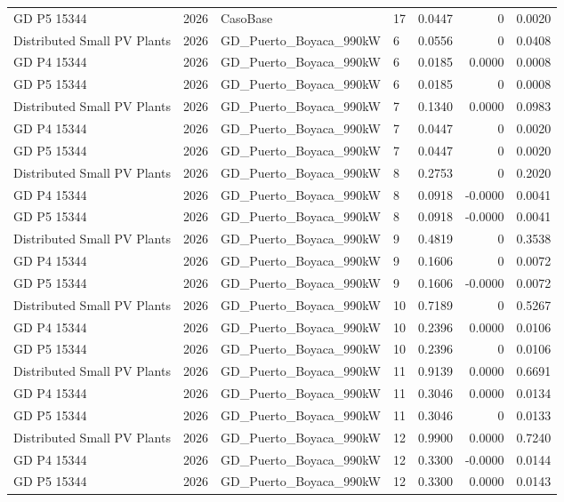 \documentclass[11pt,a4paper]{article}
\begin{document}
\begin{longtable}{llllrrr}
GD P5 15344 & 2026 & CasoBase & 17 & 0.0447 & 0 & 0.0020 \\
Distributed Small PV Plants & 2026 & GD\_Puerto\_Boyaca\_990kW & 6 & 0.0556 & 0 & 0.0408 \\
GD P4 15344 & 2026 & GD\_Puerto\_Boyaca\_990kW & 6 & 0.0185 & 0.0000 & 0.0008 \\
GD P5 15344 & 2026 & GD\_Puerto\_Boyaca\_990kW & 6 & 0.0185 & 0 & 0.0008 \\
Distributed Small PV Plants & 2026 & GD\_Puerto\_Boyaca\_990kW & 7 & 0.1340 & 0.0000 & 0.0983 \\
GD P4 15344 & 2026 & GD\_Puerto\_Boyaca\_990kW & 7 & 0.0447 & 0 & 0.0020 \\
GD P5 15344 & 2026 & GD\_Puerto\_Boyaca\_990kW & 7 & 0.0447 & 0 & 0.0020 \\
Distributed Small PV Plants & 2026 & GD\_Puerto\_Boyaca\_990kW & 8 & 0.2753 & 0 & 0.2020 \\
GD P4 15344 & 2026 & GD\_Puerto\_Boyaca\_990kW & 8 & 0.0918 & -0.0000 & 0.0041 \\
GD P5 15344 & 2026 & GD\_Puerto\_Boyaca\_990kW & 8 & 0.0918 & -0.0000 & 0.0041 \\
Distributed Small PV Plants & 2026 & GD\_Puerto\_Boyaca\_990kW & 9 & 0.4819 & 0 & 0.3538 \\
GD P4 15344 & 2026 & GD\_Puerto\_Boyaca\_990kW & 9 & 0.1606 & 0 & 0.0072 \\
GD P5 15344 & 2026 & GD\_Puerto\_Boyaca\_990kW & 9 & 0.1606 & -0.0000 & 0.0072 \\
Distributed Small PV Plants & 2026 & GD\_Puerto\_Boyaca\_990kW & 10 & 0.7189 & 0 & 0.5267 \\
GD P4 15344 & 2026 & GD\_Puerto\_Boyaca\_990kW & 10 & 0.2396 & 0.0000 & 0.0106 \\
GD P5 15344 & 2026 & GD\_Puerto\_Boyaca\_990kW & 10 & 0.2396 & 0 & 0.0106 \\
Distributed Small PV Plants & 2026 & GD\_Puerto\_Boyaca\_990kW & 11 & 0.9139 & 0.0000 & 0.6691 \\
GD P4 15344 & 2026 & GD\_Puerto\_Boyaca\_990kW & 11 & 0.3046 & 0.0000 & 0.0134 \\
GD P5 15344 & 2026 & GD\_Puerto\_Boyaca\_990kW & 11 & 0.3046 & 0 & 0.0133 \\
Distributed Small PV Plants & 2026 & GD\_Puerto\_Boyaca\_990kW & 12 & 0.9900 & 0.0000 & 0.7240 \\
GD P4 15344 & 2026 & GD\_Puerto\_Boyaca\_990kW & 12 & 0.3300 & -0.0000 & 0.0144 \\
GD P5 15344 & 2026 & GD\_Puerto\_Boyaca\_990kW & 12 & 0.3300 & 0.0000 & 0.0143 \\

\end{longtable}
\end{document}
